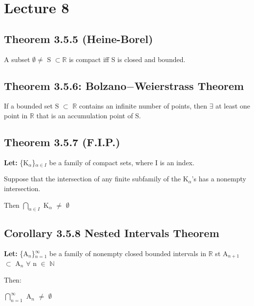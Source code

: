 \documentclass{article}
\newcommand{\mt}[1]{\ensuremath{#1}}
\newcommand\bsc[2][\DefaultOpt]{%
  \def\DefaultOpt{#2}%
  \section[#1]{#2}%
}
\newcommand\ssc[2][\DefaultOpt]{%
  \def\DefaultOpt{#2}%
  \subsection[#1]{#2}%
}
\newcommand{\lt}[1]{\textbf{Let: } #1}
\newcommand{\br}{\mt{\mathbb{R}} }       %
\newcommand{\bn}{\mt{\mathbb{N}} }       %
\newcommand{\fa}{\mt{\forall} }          %
\newcommand{\afa}{\mt{\alpha} }
\newcommand{\mem}{\mt{\in} }
\newcommand{\exs}{\mt{\exists} }
\newcommand{\es}{\mt{\emptyset} }        %
\newcommand{\sbs}{\mt{\subset} }         %
\newcommand{\uw}[2]{#1\mt{_{#2}}}
\newcommand{\nrng}[2]{\mt{\bigcap_{#1}^{#2}}}
\begin{document}
\newpage

\bsc{Lecture 8}{

\ssc{Theorem 3.5.5 (Heine-Borel)}{

A subset $\es \neq$ S $\sbs \br$ is compact iff S is closed and bounded.
}

\ssc{Theorem 3.5.6: Bolzano$-$Weierstrass Theorem}{

If a bounded set S \sbs \br contains an infinite number of points, then \exs at least one point in \br that is an accumulation point of S.
}

}

\ssc{Theorem 3.5.7 (F.I.P.)}{

\lt{\uw{\{\uw{K}{\afa}\}}{\afa \mem I} be a family of compact sets, where I is an index.}

Suppose that the intersection of any finite subfamily of the \uw{K}{\afa}'s has a nonempty intersection.

Then \nrng{\afa \mem I}{} \uw{K}{\afa} $\neq$ \es
}

\ssc{Corollary 3.5.8 Nested Intervals Theorem}{

\lt{\{\uw{A}{n}\}$^\infty_{n = 1}$ be a family of nonempty closed bounded intervals in \br st A$_{n + 1}$ \sbs A$_n$ \fa n \mem \bn}

Then:

\nrng{n = 1}{\infty} \uw{A}{n} $\neq$ \es
}

\newpage
\end{document}
